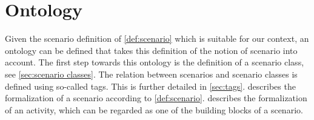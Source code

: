 \cbstart

\section{Ontology}
\label{sec:ontology}

Given the scenario definition of \cref{def:scenario} which is suitable for our context, an ontology can be defined that takes this definition of the notion of scenario into account. The first step towards this ontology is the definition of a scenario class, see \cref{sec:scenario classes}. The relation between scenarios and scenario classes is defined using so-called tags. This is further detailed in \cref{sec:tags}.  describes the formalization of a scenario according to \cref{def:scenario}.  describes the formalization of an activity, which can be regarded as one of the building blocks of a scenario.

\cbend






